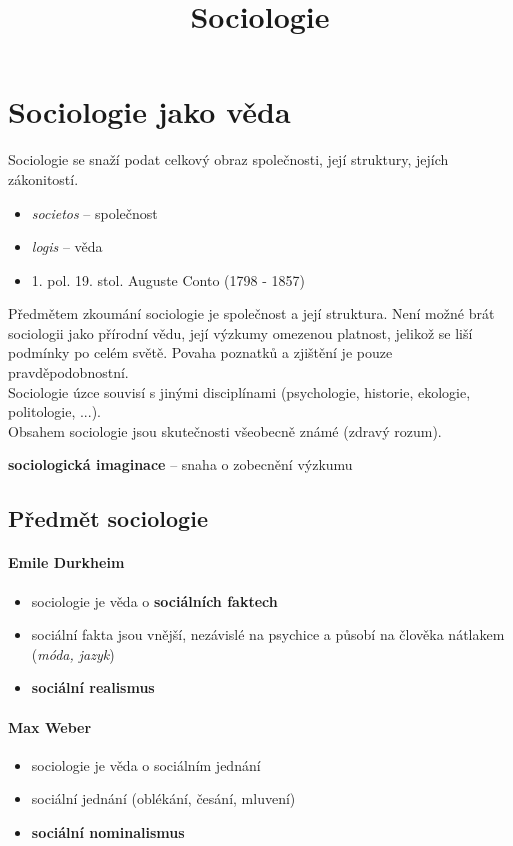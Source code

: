 \title{Sociologie}


\section{Sociologie jako věda}
Sociologie se snaží podat celkový obraz společnosti, její struktury, jejích zákonitostí.
\begin{itemize}
\item \textit{societos} -- společnost
\item \textit{logis} -- věda
\item 1. pol. 19. stol. Auguste Conto (1798 - 1857)
\end{itemize}
Předmětem zkoumání sociologie je společnost a její struktura. Není možné brát sociologii jako přírodní vědu, její výzkumy omezenou platnost, jelikož se liší podmínky po celém světě. Povaha poznatků a zjištění je pouze pravděpodobnostní.\\
Sociologie úzce souvisí s jinými disciplínami (psychologie, historie, ekologie, politologie, ...).\\
Obsahem sociologie jsou skutečnosti všeobecně známé (zdravý rozum).

\textbf{sociologická imaginace} -- snaha o zobecnění výzkumu

\subsection{Předmět sociologie}
\paragraph{Emile Durkheim}
\begin{itemize}
\item sociologie je věda o \textbf{sociálních faktech}
\item sociální fakta jsou vnější, nezávislé na psychice a působí na člověka nátlakem (\textit{móda, jazyk})
\item \textbf{sociální realismus}
\end{itemize}

\paragraph{Max Weber}
\begin{itemize}
\item sociologie je věda o sociálním jednání
\item sociální jednání (oblékání, česání, mluvení)
\item \textbf{sociální nominalismus}
\end{itemize}

